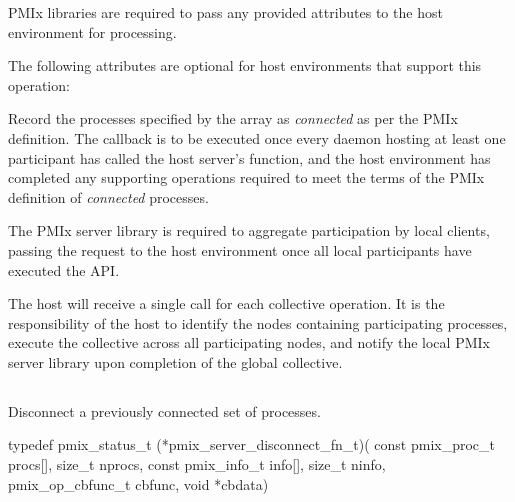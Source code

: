 \reqattrstart
\ac{PMIx} libraries are required to pass any provided attributes to the host environment for processing.
\reqattrend

\optattrstart
The following attributes are optional for host environments that support this operation:


\optattrend

\descr

Record the processes specified by the  array as \textit{connected} as per the \ac{PMIx} definition. The callback is to be executed once every daemon hosting at least one participant has called the host server's  function, and the host environment has completed any supporting operations required to meet the terms of the \ac{PMIx} definition of \textit{connected} processes.

\adviceimplstart
The \ac{PMIx} server library is required to aggregate participation by local clients, passing the request to the host environment once all local participants have executed the \ac{API}.
\adviceimplend

\advicermstart
The host will receive a single call for each collective operation. It is the responsibility of the host to identify the nodes containing participating processes, execute the collective across all participating nodes, and notify the local \ac{PMIx} server library upon completion of the global collective.
\advicermend


\subsection{}

\summary

Disconnect a previously connected set of processes.

\format

\cspecificstart
\begin{codepar}
typedef pmix_status_t (*pmix_server_disconnect_fn_t)(
                             const pmix_proc_t procs[],
                             size_t nprocs,
                             const pmix_info_t info[],
                             size_t ninfo,
                             pmix_op_cbfunc_t cbfunc,
                             void *cbdata)
\end{codepar}
\cspecificend

